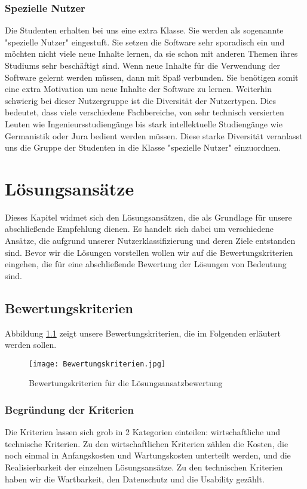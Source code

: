 \subsection{Spezielle Nutzer}
Die Studenten erhalten bei uns eine extra Klasse. Sie werden als sogenannte "spezielle Nutzer" eingestuft. Sie setzen die Software sehr sporadisch ein und möchten nicht viele neue Inhalte lernen, da sie schon mit anderen Themen ihres Studiums sehr beschäftigt sind. Wenn neue Inhalte für die Verwendung der Software gelernt werden müssen, dann mit Spaß verbunden. Sie benötigen somit eine extra Motivation um neue Inhalte der Software zu lernen. Weiterhin schwierig bei dieser Nutzergruppe ist die Diversität der Nutzertypen. Dies bedeutet, dass viele verschiedene Fachbereiche, von sehr technisch versierten Leuten wie Ingenieursstudiengänge bis stark intellektuelle Studiengänge wie Germanistik oder Jura bedient werden müssen. Diese starke Diversität veranlasst uns die Gruppe der Studenten in die Klasse "spezielle Nutzer" einzuordnen.



\chapter{Lösungsansätze}
Dieses Kapitel widmet sich den Lösungsansätzen, die als Grundlage für unsere abschließende Empfehlung dienen. Es handelt sich dabei um verschiedene Ansätze, die aufgrund unserer Nutzerklassifizierung und deren Ziele entstanden sind. Bevor wir die Lösungen vorstellen wollen wir auf die Bewertungskriterien eingehen, die für eine abschließende Bewertung der Lösungen von Bedeutung sind.
\section{Bewertungskriterien}
Abbildung \ref{img1:criteria} zeigt unsere Bewertungskriterien, die im Folgenden erläutert werden sollen.
\begin{figure}[ht]
\begin{center}
\texttt{[image: Bewertungskriterien.jpg]}
\caption{Bewertungskriterien für die Lösungsansatzbewertung}
\label{img1:criteria}
\end{center}
\end{figure} 

\subsection{Begründung der Kriterien}
Die Kriterien lassen sich grob in 2 Kategorien einteilen: wirtschaftliche und technische Kriterien. Zu den wirtschaftlichen Kriterien zählen die Kosten, die noch einmal in Anfangskosten und Wartungskosten unterteilt werden, und die Realisierbarkeit der einzelnen Lösungsansätze. Zu den technischen Kriterien haben wir die Wartbarkeit, den Datenschutz und die Usability gezählt.
